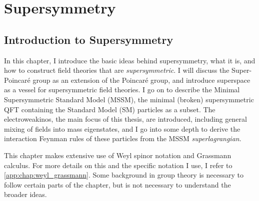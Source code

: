 \documentclass[../main.tex]{subfiles}
\begin{document}
\chapter{Supersymmetry}


\section{Introduction to Supersymmetry}
\label{susy:sec:introduction}
In this chapter, I introduce the basic ideas behind supersymmetry, what it is, and how to construct field theories that are \emph{supersymmetric}.
I will discuss the Super-Poincaré group as an extension of the Poincaré group, and introduce superspace as a vessel for supersymmetric field theories.
I go on to describe the Minimal Supersymmetric Standard Model (MSSM), the minimal (broken) supersymmetric QFT containing the Standard Model (SM) particles as a subset.
The electroweakinos, the main focus of this thesis, are introduced, including general mixing of fields into mass eigenstates, and I go into some depth to derive the interaction Feynman rules of these particles from the MSSM \emph{superlagrangian}.

This chapter makes extensive use of Weyl spinor notation and Grassmann calculus. For more details on this and the specific notation I use, I refer to \cref{app:chap:weyl_grassmann}.
Some background in group theory is necessary to follow certain parts of the chapter, but is not necessary to understand the broader ideas.
\end{document}
